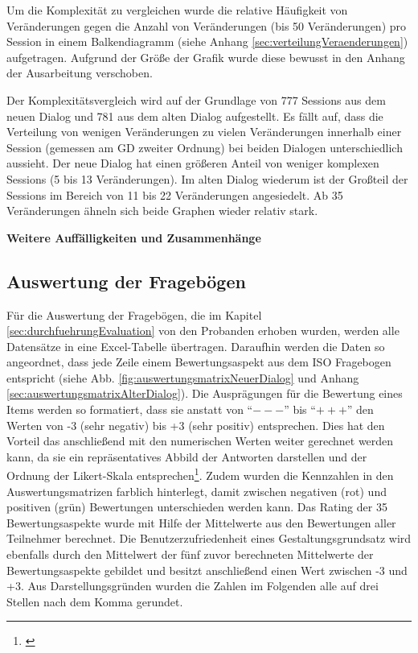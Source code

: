 Um die Komplexität zu vergleichen wurde die relative Häufigkeit von Veränderungen gegen die Anzahl von Veränderungen (bis 50 Veränderungen) pro Session in einem Balkendiagramm (siehe Anhang \ref{sec:verteilungVeraenderungen}) aufgetragen. Aufgrund der Größe der Grafik wurde diese bewusst in den Anhang der Ausarbeitung verschoben. 

Der Komplexitätsvergleich wird auf der Grundlage von 777 Sessions aus dem neuen Dialog und 781 aus dem alten Dialog aufgestellt. Es fällt auf, dass die Verteilung von wenigen Veränderungen zu vielen Veränderungen innerhalb einer Session (gemessen am GD zweiter Ordnung) bei beiden Dialogen unterschiedlich aussieht. Der neue Dialog hat einen größeren Anteil von weniger komplexen Sessions (5 bis 13 Veränderungen). Im alten Dialog wiederum ist der Großteil der Sessions im Bereich von 11 bis 22 Veränderungen angesiedelt. Ab 35 Veränderungen ähneln sich beide Graphen wieder relativ stark. 


\textbf{Weitere Auffälligkeiten und Zusammenhänge}

\subsection{Auswertung der Fragebögen}
\label{sec:auswertungDerFrageboegen}
Für die Auswertung der Fragebögen, die im Kapitel \ref{sec:durchfuehrungEvaluation} von den Probanden erhoben wurden, werden alle Datensätze in eine Excel-Tabelle übertragen. Daraufhin werden die Daten so angeordnet, dass jede Zeile einem Bewertungsaspekt aus dem ISO Fragebogen entspricht (siehe Abb. \ref{fig:auswertungsmatrixNeuerDialog} und Anhang \ref{sec:auswertungsmatrixAlterDialog}). Die Ausprägungen für die Bewertung eines Items werden so formatiert, dass sie anstatt von \enquote{$---$} bis \enquote{$+++$} den Werten von -3 (sehr negativ) bis +3 (sehr positiv) entsprechen. Dies hat den Vorteil das anschließend mit den numerischen Werten weiter gerechnet werden kann, da sie ein repräsentatives Abbild der Antworten darstellen und der Ordnung der Likert-Skala entsprechen\footnote{\cite[vgl.][]{Statista}}. Zudem wurden die Kennzahlen in den Auswertungsmatrizen farblich hinterlegt, damit zwischen negativen (rot) und positiven (grün) Bewertungen unterschieden werden kann. Das Rating der 35 Bewertungsaspekte wurde mit Hilfe der Mittelwerte aus den Bewertungen aller Teilnehmer berechnet. Die Benutzerzufriedenheit eines Gestaltungsgrundsatz wird ebenfalls durch den Mittelwert der fünf zuvor berechneten Mittelwerte der Bewertungsaspekte gebildet und besitzt anschließend einen Wert zwischen -3 und +3. Aus Darstellungsgründen wurden die Zahlen im Folgenden alle auf drei Stellen nach dem Komma gerundet.

